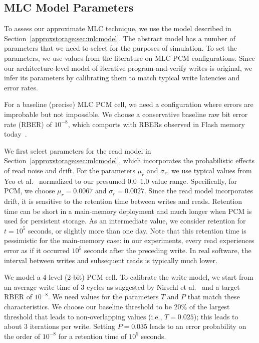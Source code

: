 \subsection{MLC Model Parameters}
\label{approxstorage:sec:errorparams}

To assess our approximate MLC technique, we use the model described in
Section~\ref{approxstorage:sec:mlcmodel}. The abstract model has a number of parameters that
we need to select for the purposes of simulation. To set the parameters, we use
values from the literature on MLC PCM configurations. Since our
architecture-level model of iterative program-and-verify writes is original, we
infer its parameters by calibrating them to match typical write latencies and error
rates.

For a baseline (precise) MLC PCM cell, we need a configuration where
errors are improbable but not impossible. We choose a conservative
baseline raw bit error rate (RBER) of $10^{-8}$, which comports with
RBERs observed in Flash memory today~\cite{flasherror,flasherrors}.

We first select parameters for the read model in Section~\ref{approxstorage:sec:mlcmodel},
which incorporates the probabilistic effects of read noise and drift.
For the parameters $\mu_r$ and $\sigma_r$, we use typical values from
Yeo et al.~\cite{wdddmlcpcm} normalized to our presumed 0.0--1.0 value
range. Specifically, for PCM, we choose $\mu_r = 0.0067$ and $\sigma_r
= 0.0027$. Since the read model incorporates drift, it is sensitive to
the retention time between writes and reads. Retention time can be
short in a main-memory deployment and much longer when PCM is
used for persistent storage.  As an intermediate value, we consider
retention for $t = 10^{5}$ seconds, or slightly more than one day.
Note that this retention time is pessimistic for the main-memory
case: in our experiments, every read experiences error as if it
occurred $10^5$ seconds after the preceding write. In real software,
the interval between writes and subsequent reads is typically much
lower.

We model a 4-level (2-bit) PCM cell. To calibrate the write model, we start from an average write
time of 3 cycles as suggested by Nirschl et
al.~\cite{mlcwritestrategies} and a target RBER of $10^{-8}$.
We need values for the parameters $T$ and $P$ that
match these characteristics. We choose our baseline threshold to be 20\%
of the largest threshold that leads to non-overlapping values
(i.e., $T = 0.025$); this leads to about 3 iterations per write.
Setting $P = 0.035$ leads to an error probability on the order of
$10^{-8}$ for a retention time of $10^5$ seconds.

